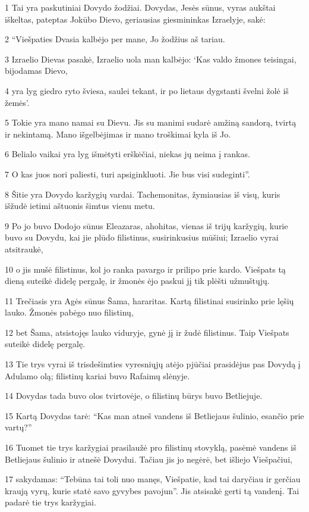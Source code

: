 \par 1 Tai yra paskutiniai Dovydo žodžiai. Dovydas, Jesės sūnus, vyras aukštai iškeltas, pateptas Jokūbo Dievo, geriausias giesmininkas Izraelyje, sakė: 
\par 2 “Viešpaties Dvasia kalbėjo per mane, Jo žodžius aš tariau. 
\par 3 Izraelio Dievas pasakė, Izraelio uola man kalbėjo: ‘Kas valdo žmones teisingai, bijodamas Dievo, 
\par 4 yra lyg giedro ryto šviesa, saulei tekant, ir po lietaus dygstanti švelni žolė iš žemės’. 
\par 5 Tokie yra mano namai su Dievu. Jis su manimi sudarė amžiną sandorą, tvirtą ir nekintamą. Mano išgelbėjimas ir mano troškimai kyla iš Jo. 
\par 6 Belialo vaikai yra lyg išmėtyti erškėčiai, niekas jų neima į rankas. 
\par 7 O kas juos nori paliesti, turi apsiginkluoti. Jie bus visi sudeginti”. 
\par 8 Šitie yra Dovydo karžygių vardai. Tachemonitas, žymiausias iš visų, kuris išžudė ietimi aštuonis šimtus vienu metu. 
\par 9 Po jo buvo Dodojo sūnus Eleazaras, ahohitas, vienas iš trijų karžygių, kurie buvo su Dovydu, kai jie plūdo filistinus, susirinkusius mūšiui; Izraelio vyrai atsitraukė, 
\par 10 o jis mušė filistinus, kol jo ranka pavargo ir prilipo prie kardo. Viešpats tą dieną suteikė didelę pergalę, ir žmonės ėjo paskui jį tik plėšti užmuštųjų. 
\par 11 Trečiasis yra Agės sūnus Šama, hararitas. Kartą filistinai susirinko prie lęšių lauko. Žmonės pabėgo nuo filistinų, 
\par 12 bet Šama, atsistojęs lauko viduryje, gynė jį ir žudė filistinus. Taip Viešpats suteikė didelę pergalę. 
\par 13 Tie trys vyrai iš trisdešimties vyresniųjų atėjo pjūčiai prasidėjus pas Dovydą į Adulamo olą; filistinų kariai buvo Rafaimų slėnyje. 
\par 14 Dovydas tada buvo olos tvirtovėje, o filistinų būrys buvo Betliejuje. 
\par 15 Kartą Dovydas tarė: “Kas man atneš vandens iš Betliejaus šulinio, esančio prie vartų?” 
\par 16 Tuomet tie trys karžygiai prasilaužė pro filistinų stovyklą, pasėmė vandens iš Betliejaus šulinio ir atnešė Dovydui. Tačiau jis jo negėrė, bet išliejo Viešpačiui, 
\par 17 sakydamas: “Tebūna tai toli nuo manęs, Viešpatie, kad tai daryčiau ir gerčiau kraują vyrų, kurie statė savo gyvybes pavojun”. Jis atsisakė gerti tą vandenį. Tai padarė tie trys karžygiai. 
